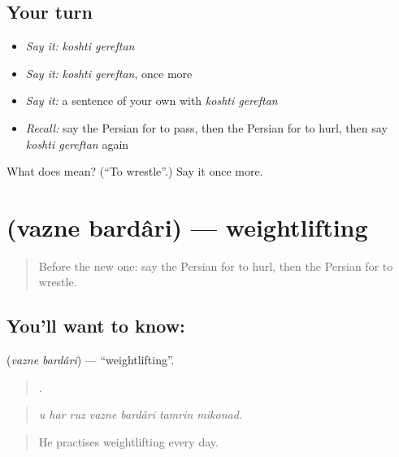 \subsection*{Your turn}
\begin{itemize}
\raggedright
  \item \emph{Say it:} \emph{koshti gereftan}
  \item \emph{Say it:} \emph{koshti gereftan}, once more
  \item \emph{Say it:} a sentence of your own with \emph{koshti gereftan}
  \item \emph{Recall:} say the Persian for to pass, then the Persian for to hurl, then say \emph{koshti gereftan} again
\end{itemize}

\begin{tcolorbox}[breakable,colback=teal!4,colframe=teal!35!black,title={Before you move on}]
What does   mean? (\textquotedblleft{}To wrestle\textquotedblright{}.) Say it once more.
\end{tcolorbox}
\section[\texorpdfstring{\fa{وزنه} \fa{برداری} (vazne bardâri)}{وزنه برداری (vazne bardâri)}]{  (vazne bardâri) — weightlifting}

\label{lesson:FA-C515-vazne-bardari}



\begin{quote}
Before the new one: say the Persian for to hurl, then the Persian for to wrestle.
\end{quote}

\subsection*{You'll want to know:  }
\textbf{ } (\emph{vazne bardâri}) — \textquotedblleft{}weightlifting\textquotedblright{}.

\begin{quote}
      .
\end{quote}

\begin{quote}
\emph{u har ruz vazne bardâri tamrin mikonad.}
\end{quote}

\begin{quote}
He practises weightlifting every day.
\end{quote}

